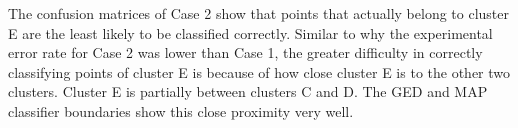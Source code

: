 The confusion matrices of Case 2 show that points that actually belong to cluster E are the least likely to be classified correctly. Similar to why the experimental error rate for Case 2 was lower than Case 1, the greater difficulty in correctly classifying points of cluster E is because of how close cluster E is to the other two clusters. Cluster E is partially between clusters C and D. The GED and MAP classifier boundaries show this close proximity very well.
 
\clearpage
